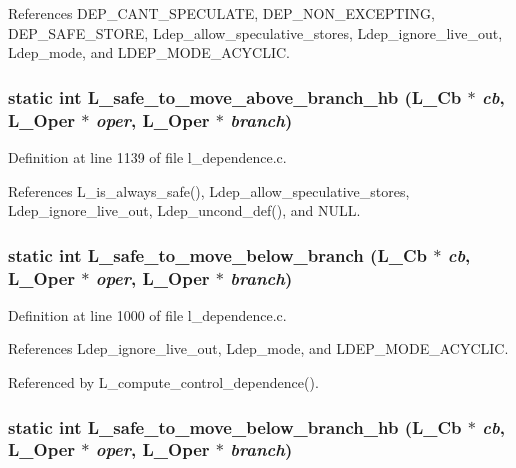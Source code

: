 References DEP\_\-CANT\_\-SPECULATE, DEP\_\-NON\_\-EXCEPTING, DEP\_\-SAFE\_\-STORE, Ldep\_\-allow\_\-speculative\_\-stores, Ldep\_\-ignore\_\-live\_\-out, Ldep\_\-mode, and LDEP\_\-MODE\_\-ACYCLIC.
\subsubsection{\setlength{\rightskip}{0pt plus 5cm}static int L\_\-safe\_\-to\_\-move\_\-above\_\-branch\_\-hb (L\_\-Cb $\ast$ {\em cb}, L\_\-Oper $\ast$ {\em oper}, L\_\-Oper $\ast$ {\em branch})\hspace{0.3cm}{\tt  [static]}}\label{l__dependence_8c_2b0d68d4fa57007b599bbdded3d70ef5}




Definition at line 1139 of file l\_\-dependence.c.

References L\_\-is\_\-always\_\-safe(), Ldep\_\-allow\_\-speculative\_\-stores, Ldep\_\-ignore\_\-live\_\-out, Ldep\_\-uncond\_\-def(), and NULL.
\subsubsection{\setlength{\rightskip}{0pt plus 5cm}static int L\_\-safe\_\-to\_\-move\_\-below\_\-branch (L\_\-Cb $\ast$ {\em cb}, L\_\-Oper $\ast$ {\em oper}, L\_\-Oper $\ast$ {\em branch})\hspace{0.3cm}{\tt  [static]}}\label{l__dependence_8c_30631f51de7d743f9858bf3b4c867cf0}




Definition at line 1000 of file l\_\-dependence.c.

References Ldep\_\-ignore\_\-live\_\-out, Ldep\_\-mode, and LDEP\_\-MODE\_\-ACYCLIC.

Referenced by L\_\-compute\_\-control\_\-dependence().
\subsubsection{\setlength{\rightskip}{0pt plus 5cm}static int L\_\-safe\_\-to\_\-move\_\-below\_\-branch\_\-hb (L\_\-Cb $\ast$ {\em cb}, L\_\-Oper $\ast$ {\em oper}, L\_\-Oper $\ast$ {\em branch})\hspace{0.3cm}{\tt  [static]}}\label{l__dependence_8c_3407e8c379d563c292f0359b5ecbce28}




